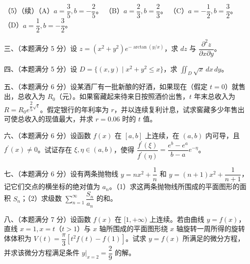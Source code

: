 \documentclass[UTF8,12pt]{ctexart}
\begin{document}
（5）（续）（A）\(\displaystyle a=\dfrac{\displaystyle 3}{\displaystyle 5},\allowbreak b=-\dfrac{\displaystyle 2}{\displaystyle 5}\)。 （B）\(\displaystyle a=\dfrac{\displaystyle 2}{\displaystyle 3},\allowbreak b=\dfrac{\displaystyle 2}{\displaystyle 3}\)。 （C）\(\displaystyle a=-\dfrac{\displaystyle 1}{\displaystyle 2},\allowbreak b=\dfrac{\displaystyle 3}{\displaystyle 2}\)。 （D）\(\displaystyle a=\dfrac{\displaystyle 1}{\displaystyle 2},\allowbreak b=-\dfrac{\displaystyle 3}{\displaystyle 2}\)。


三、（本题满分 5 分）设 \(\displaystyle z=(x^2+y^2)e^{-\arctan(y/x)}\)，求 \(\displaystyle dz\) 与 \(\displaystyle \dfrac{\displaystyle \partial^2z}{\displaystyle \partial x\partial y}\)。


四、（本题满分 5 分）设 \(\displaystyle D=\{(x,\allowbreak y)\mid x^2+y^2\leq x\}\)，求 \(\displaystyle \iint_D\sqrt{x}\,dx\,dy\)。


五、（本题满分 6 分）设某酒厂有一批新酿的好酒，如果现在（假定 \(\displaystyle t=0\)）就售出，总收入为 \(\displaystyle R_0\)（元）。如果窖藏起来待来日按照酒价出售，\(\displaystyle t\) 年末总收入为 \(\displaystyle R=R_0e^{\dfrac{\displaystyle 2}{\displaystyle 5}\sqrt t}\)。假定银行的年利率为 \(\displaystyle r\)，并以连续复利计息，试求窖藏多少年售出可使总收入的现值最大，并求 \(\displaystyle r=0.06\) 时的 \(\displaystyle t\) 值。


六、（本题满分 6 分）设函数 \(\displaystyle f(x)\) 在 \(\displaystyle [a,\allowbreak b]\) 上连续，在 \(\displaystyle (a,\allowbreak b)\) 内可导，且 \(\displaystyle f^{\prime}(x)\ne0\)。试证存在 \(\displaystyle \xi,\allowbreak \eta\in(a,\allowbreak b)\)，使得 \(\displaystyle \dfrac{\displaystyle f^{\prime}(\xi)}{\displaystyle f^{\prime}(\eta)}=\dfrac{\displaystyle e^b-e^a}{\displaystyle b-a}e^{-\eta}\)。


七、（本题满分 6 分）设有两条抛物线 \(\displaystyle y=nx^2+\dfrac{\displaystyle 1}{\displaystyle n}\) 和 \(\displaystyle y=(n+1)x^2+\dfrac{\displaystyle 1}{\displaystyle n+1}\)，记它们交点的横坐标的绝对值为 \(\displaystyle a_n\)。（1）求这两条抛物线所围成的平面图形的面积 \(\displaystyle S_n\)；（2）求级数 \(\displaystyle \sum_{n=1}^{\infty}\dfrac{\displaystyle S_n}{\displaystyle a_n}\) 的和。


八、（本题满分 7 分）设函数 \(\displaystyle f(x)\) 在 \(\displaystyle [1,\allowbreak +\infty)\) 上连续。若由曲线 \(\displaystyle y=f(x)\)，直线 \(\displaystyle x=1,\allowbreak  x=t\)（\(\displaystyle t>1\)）与 \(\displaystyle x\) 轴所围成的平面图形绕 \(\displaystyle x\) 轴旋转一周所得的旋转体体积为 \(\displaystyle V(t)=\dfrac{\displaystyle \pi}{\displaystyle 3}[t^2f(t)-f(1)]\)。试求 \(\displaystyle y=f(x)\) 所满足的微分方程，并求该微分方程满足条件 \(\displaystyle \left.y\right|_{x=2}=\dfrac{\displaystyle 2}{\displaystyle 9}\) 的解。
\end{document}
